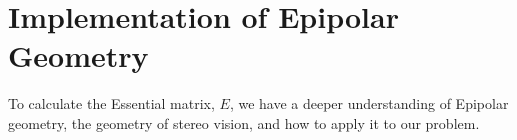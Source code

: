 \documentclass{article}
\begin{document}
\section{Implementation of Epipolar Geometry}
\begin{tcolorbox}[enhanced,breakable, sharp corners, colback=blue!5!white, colframe=blue!55!black, boxrule=0mm,top=0mm,bottom=0mm,leftrule=1mm, drop shadow=black!40!white, title=Step 3 --- Compute the Essential matrix]
To calculate the Essential matrix, $E$, we have a deeper understanding of Epipolar geometry, the geometry of stereo vision, and how to apply it to our problem.
\end{tcolorbox}


\section{}
\end{document}
